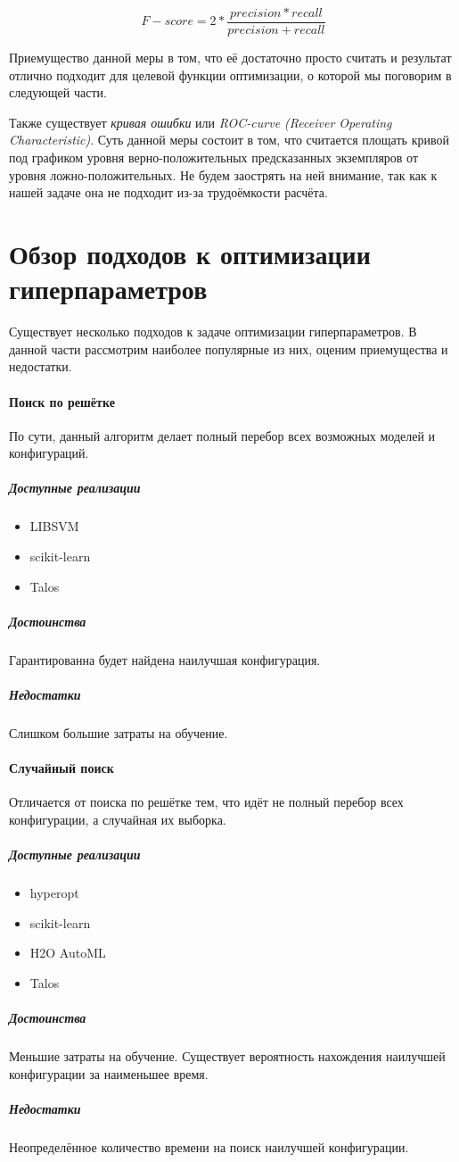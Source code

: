 \documentclass[times,specification,annotation]{itmo-student-thesis}
\begin{document}
	\begin{equation}
 	\mathit{F-score} =  2 * \frac{precision*recall}{precision+recall} 
 	\label{eq:fscore}
	\end{equation}
		
	Приемущество данной меры в том, что её достаточно просто считать и результат отлично подходит для целевой функции оптимизации, о которой мы поговорим в следующей части.\par
	
	Также существует \textit{кривая ошибки} или \textit{ROC-curve (Receiver Operating Characteristic)}. Суть данной меры состоит в том, что считается площать кривой под графиком уровня верно-положительных предсказанных экземпляров от уровня ложно-положительных. Не будем заострять на ней внимание, так как к нашей задаче она не подходит из-за трудоёмкости расчёта. 
	
	
	\section{Обзор подходов к оптимизации гиперпараметров}
	Существует несколько подходов к задаче оптимизации гиперпараметров. В данной части рассмотрим наиболее популярные из них, оценим приемущества и недостатки.
	\paragraph{Поиск по решётке} По сути, данный алгоритм делает полный перебор всех возможных моделей и конфигураций.
		\subparagraph{Доступные реализации}
		\begin{itemize}
			\item LIBSVM
			\item scikit-learn
			\item Talos
		\end{itemize}
		\subparagraph{Достоинства} Гарантированна будет найдена наилучшая конфигурация.
		\subparagraph{Недостатки} Слишком большие затраты на обучение.
	\paragraph{Случайный поиск} Отличается от поиска по решётке тем, что идёт не полный перебор всех конфигурации, а случайная их выборка.
		\subparagraph{Доступные реализации}
		\begin{itemize}
			\item hyperopt
			\item scikit-learn
			\item H2O AutoML
			\item Talos
		\end{itemize}
		\subparagraph{Достоинства} Меньшие затраты на обучение. Существует вероятность нахождения наилучшей конфигурации за наименьшее время.
		\subparagraph{Недостатки} Неопределённое количество времени на поиск наилучшей конфигурации.
\end{document}
